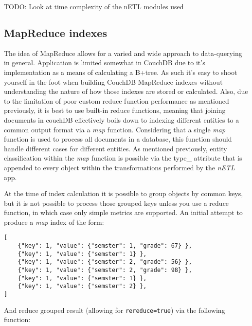 TODO: Look at time complexity of the nETL modules used

\subsection{MapReduce indexes}
The idea of MapReduce allows for a varied and wide approach to data-querying in general. Application is limited somewhat in CouchDB due to it's implementation as a means of calculating a B+tree. As such it's easy to shoot yourself in the foot when building CouchDB MapReduce indexes without understanding the nature of how those indexes are stored or calculated. Also, due to the limitation of poor custom reduce function performance as mentioned previously, it is best to use built-in reduce functions, meaning that joining documents in couchDB effectively boils down to indexing different entities to a common output format via a \textit{map} function. Considering that a single \textit{map} function is used to process all documents in a database, this function should handle different cases for different entities. As mentioned previously, entity classification within the \textit{map} function is possible via the type\_ attribute that is appended to every object within the transformations performed by the \textit{nETL} app.

At the time of index calculation it is possible to group objects by common keys, but it is not possible to process those grouped keys unless you use a reduce function, in which case only simple metrics are supported. An initial attempt to produce a \textit{map} index of the form:

\begin{verbatim}
[
    {"key": 1, "value": {"semster": 1, "grade": 67} },
    {"key": 1, "value": {"semster": 1} },
    {"key": 1, "value": {"semster": 2, "grade": 56} },
    {"key": 1, "value": {"semster": 2, "grade": 98} },
    {"key": 1, "value": {"semster": 1} },
    {"key": 1, "value": {"semster": 2} },
]
\end{verbatim}

And reduce grouped result (allowing for \texttt{rereduce=true}) via the following function:

